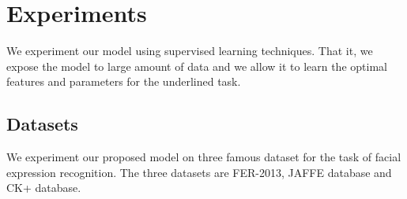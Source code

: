 \documentclass[master]{thesis-uestc}
\begin{document}
\section{Experiments}
We experiment our model using supervised learning techniques. That it, we expose the model to large amount of data and we allow it to learn the optimal features and parameters for the underlined task.

\subsection{Datasets}
We experiment our proposed model on three famous dataset for the task of facial expression recognition. The three datasets are FER-2013\cite{fer2013_cite}, JAFFE database\cite{Michael-2017} and CK+ database\cite{5543262}.
\end{document}
